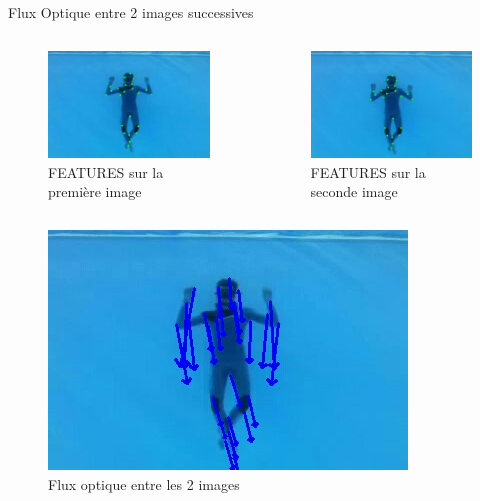 \documentclass{bredelebeamer}
\begin{document}
\begin{frame}{Flux Optique entre 2 images successives}

\begin{columns}
\begin{column}{0.3\textwidth}
\begin{figure}
\centering
\includegraphics[scale=0.3]{images/plongeurInitFeatures.jpeg}
\caption{FEATURES sur la première image}
\end{figure}
\end{column}


\begin{column}{0.3\textwidth}
\begin{figure}
\centering
\includegraphics[scale=0.3]{images/plongeurNextFeatures.jpeg}
\caption{FEATURES sur la seconde image}
\end{figure}
\end{column}

\end{columns}

\begin{figure}
\centering
\includegraphics[scale=0.3]{images/plongeurOpticalFlow.jpeg}
\caption{Flux optique entre les 2 images}
\end{figure}


\end{frame}
\end{document}
